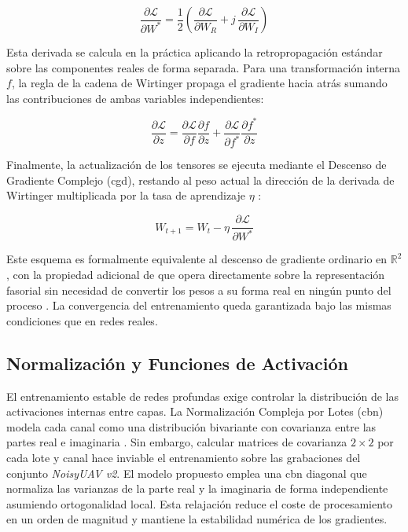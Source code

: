 \begin{equation}
    \frac{\partial \mathcal{L}}{\partial W^*} = \frac{1}{2}\left(\frac{\partial \mathcal{L}}{\partial W_R} + j\,\frac{\partial \mathcal{L}}{\partial W_I}\right)
    \label{eq:wirtinger}
\end{equation}

Esta derivada se calcula en la práctica aplicando la retropropagación estándar sobre las componentes reales de forma separada. Para una transformación interna $f$, la regla de la cadena de Wirtinger propaga el gradiente hacia atrás sumando las contribuciones de ambas variables independientes:

\begin{equation}
    \frac{\partial \mathcal{L}}{\partial z} = \frac{\partial \mathcal{L}}{\partial f} \frac{\partial f}{\partial z} + \frac{\partial \mathcal{L}}{\partial f^*} \frac{\partial f^*}{\partial z}
    \label{eq:regla_cadena_wirtinger}
\end{equation}

Finalmente, la actualización de los tensores se ejecuta mediante el Descenso de Gradiente Complejo (\gls{cgd}), restando al peso actual la dirección de la derivada de Wirtinger multiplicada por la tasa de aprendizaje $\eta$ \cite{bouboulis_extension_2011}:

\begin{equation}
    W_{t+1} = W_t - \eta\,\frac{\partial \mathcal{L}}{\partial W^*}
    \label{eq:complex_gradient_descent}
\end{equation}

Este esquema es formalmente equivalente al descenso de gradiente ordinario en $\mathbb{R}^2$, con la propiedad adicional de que opera directamente sobre la representación fasorial sin necesidad de convertir los pesos a su forma real en ningún punto del proceso \cite{bouboulis_extension_2011}. La convergencia del entrenamiento queda garantizada bajo las mismas condiciones que en redes reales.

\subsection{Normalización y Funciones de Activación}
El entrenamiento estable de redes profundas exige controlar la distribución de las activaciones internas entre capas. La Normalización Compleja por Lotes (\gls{cbn}) modela cada canal como una distribución bivariante con covarianza entre las partes real e imaginaria \cite{trabelsi_deep_2018}. Sin embargo, calcular matrices de covarianza $2 \times 2$ por cada lote y canal hace inviable el entrenamiento sobre las grabaciones del conjunto \textit{NoisyUAV v2}. El modelo propuesto emplea una \gls{cbn} diagonal que normaliza las varianzas de la parte real y la imaginaria de forma independiente asumiendo ortogonalidad local. Esta relajación reduce el coste de procesamiento en un orden de magnitud y mantiene la estabilidad numérica de los gradientes.

